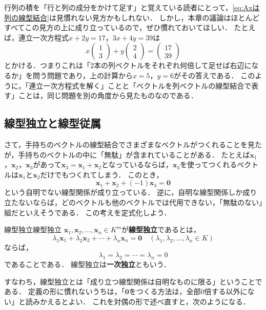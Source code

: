 行列の積を「行と列の成分をかけて足す」と覚えている読者にとって，\eqref{eq:Axは列の線型結合}は見慣れない見方かもしれない．
しかし，本章の議論はほとんどすべてこの見方の上に成り立っているので，ぜひ慣れておいてほしい．
たとえば，連立一次方程式$x + 2y = 17$，$3x + 4y = 39$は
\[
  x \begin{pmatrix} 1 \\ 3 \end{pmatrix} + y \begin{pmatrix} 2 \\ 4 \end{pmatrix} = \begin{pmatrix} 17 \\ 39 \end{pmatrix}
\]
とかける．つまりこれは「$2$本の列ベクトルをそれぞれ何倍して足せば右辺になるか」を問う問題であり，上の計算から$x = 5$，$y = 6$がその答えである．
このように，「連立一次方程式を解く」ことと「ベクトルを列ベクトルの線型結合で表す」ことは，同じ問題を別の角度から見たものなのである．

\subsection{線型独立と線型従属}

さて，手持ちのベクトルの線型結合でさまざまなベクトルがつくれることを見たが，手持ちのベクトルの中に「無駄」が含まれていることがある．
たとえば$\bm{x}_1$，$\bm{x}_2$，$\bm{x}_3$があって$\bm{x}_3 = \bm{x}_1 + \bm{x}_2$となっているならば，$\bm{x}_3$を使ってつくれるベクトルは$\bm{x}_1$と$\bm{x}_2$だけでもつくれてしまう．
このとき，
\[
  \bm{x}_1 + \bm{x}_2 + (-1)\bm{x}_3 = \bm{0}
\]
という自明でない線型関係が成り立っている．
逆に，自明な線型関係しか成り立たないならば，どのベクトルも他のベクトルでは代用できない，「無駄のない」組だといえそうである．
この考えを定式化しよう．

\begin{definition}{線型独立}{線型独立}
  $\bm{x}_1, \bm{x}_2, \dots, \bm{x}_n \in K^m$が\textbf{線型独立}であるとは，
  \[
    \lambda_1 \bm{x}_1 + \lambda_2 \bm{x}_2 + \cdots + \lambda_n \bm{x}_n = \bm{0}
    \quad (\lambda_1, \lambda_2, \dots, \lambda_n \in K)
  \]
  ならば，
  \[
    \lambda_1=\lambda_2=\cdots=\lambda_n = 0
  \]
  であることである．
  線型独立は\textbf{一次独立}ともいう．
\end{definition}

すなわち，線型独立とは「成り立つ線型関係は自明なものに限る」ということである．
定義の形に慣れないうちは，「$\bm{0}$をつくる方法は，全部$0$倍する以外にない」と読みかえるとよい．
これを対偶の形で述べ直すと，次のようになる．

